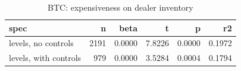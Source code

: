 \begin{table}
\caption{BTC: expensiveness on dealer inventory}
\label{tab:t5_timeseries_BTC}
\begin{tabular}{lrrrrr}
\toprule
spec & n & beta & t & p & r2 \\
\midrule
levels, no controls & 2191 & 0.0000 & 7.8226 & 0.0000 & 0.1972 \\
levels, with controls & 979 & 0.0000 & 3.5284 & 0.0004 & 0.1794 \\
\bottomrule
\end{tabular}
\end{table}
